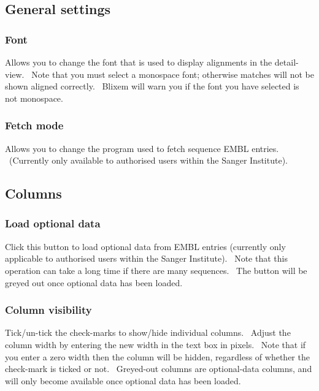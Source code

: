 \documentclass[letterpaper]{article}
\begin{document}
\bigskip

{\color[rgb]{0.30980393,0.5058824,0.7411765}\subsection[General settings]{General settings}}
\hypertarget{RefHeading2421056909880}{}
{\color[rgb]{0.30980393,0.5058824,0.7411765}\subsubsection[Font]{Font}}
\hypertarget{RefHeading2441056909880}{}{
Allows you to change the font that is used to display alignments in the
detail-view. \ Note that you must select a monospace font; otherwise
matches will not be shown aligned correctly. \ Blixem will warn you if
the font you have selected is not monospace.}

\bigskip

{\color[rgb]{0.30980393,0.5058824,0.7411765}\subsubsection[Fetch mode ]{Fetch mode }}
\hypertarget{RefHeading2461056909880}{}{
Allows you to change the program used to fetch sequence EMBL entries.
\ (Currently only available to authorised users within the Sanger
Institute).}

\bigskip

{\color[rgb]{0.30980393,0.5058824,0.7411765}\subsection[Columns]{Columns}}
\hypertarget{RefHeading2481056909880}{}
{\color[rgb]{0.30980393,0.5058824,0.7411765}\subsubsection[Load optional data
]{Load optional data }}
\hypertarget{RefHeading2501056909880}{}
{Click this button to load optional data from EMBL entries (currently
only applicable to authorised users within the Sanger Institute).
\ Note that this operation can take a long time if there are many
sequences. \ The button will be greyed out once optional data has been
loaded.}

\bigskip

{\color[rgb]{0.30980393,0.5058824,0.7411765}\subsubsection[Column visibility]{Column visibility}}
\hypertarget{RefHeading2521056909880}{}
Tick/un-tick the check-marks to show/hide individual columns. \ Adjust
the column width by entering the new width in the text box in pixels.
\ Note that if you enter a zero width then the column will be hidden,
regardless of whether the check-mark is ticked or not. \ Greyed-out
columns are optional-data columns, and will only become available once
optional data has been loaded.
\end{document}
